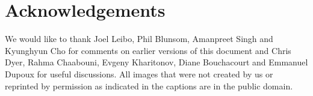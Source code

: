 \section*{Acknowledgements}

We would like to thank Joel Leibo, Phil Blunsom, Amanpreet Singh and Kyunghyun Cho for comments on earlier versions of this document and Chris Dyer, Rahma Chaabouni, Evgeny Kharitonov, Diane Bouchacourt and Emmanuel Dupoux for useful discussions. All images that were not created by us or reprinted by permission as indicated in the captions are in the public domain.